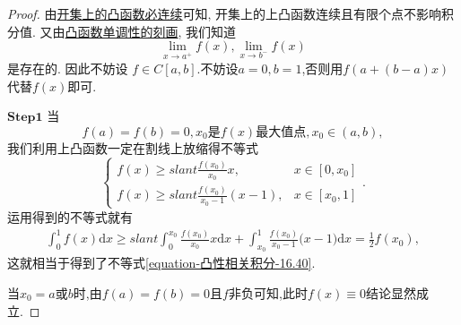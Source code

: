 \documentclass[../../main.tex]{subfiles}
\begin{document}
\begin{proof}
由\hyperref[corollary:开集上的下凸函数必连续]{开集上的凸函数必连续}可知, 开集上的上凸函数连续且有限个点不影响积分值. 又由\hyperref[proposition:下凸函数的单调性刻画]{凸函数单调性的刻画}, 我们知道
\[\lim_{x \to a^+}f(x), \lim_{x \to b^-}f(x)\]
是存在的. 因此不妨设 $f \in C[a,b]$.不妨设$a=0,b=1$,否则用$f(a+(b-a)x)$代替$f(x)$即可.

$\mathbf{Step}\mathbf{1}$ 当
\[f(a) = f(b) = 0, x_0\text{是}f(x)\text{最大值点}, x_0 \in (a,b),\]
我们利用上凸函数一定在割线上放缩得不等式
\[
\begin{cases}
f(x) \geqslant slant   \frac{f(x_0) }{x_0 }x, &x \in [0,x_0]\\
f(x) \geqslant slant \frac{f(x_0) }{x_0 - 1}(x - 1), &x \in [x_0,1]
\end{cases}.
\]
运用得到的不等式就有
\begin{align*}
\int_0^1{f(x)\mathrm{d}x\geqslant slant \int_0^{x_0}{\frac{f(x_0)}{x_0}x}}\mathrm{d}x+\int_{x_0}^1{\frac{f(x_0)}{x_0-1}(x}-1)\mathrm{d}x=\frac{1}{2}f(x_0),
\end{align*}
这就相当于得到了不等式\eqref{equation-凸性相关积分-16.40}.

当$x_0=a\text{或}b$时,由$f(a)=f(b)=0$且$f$非负可知,此时$f(x)\equiv 0$结论显然成立.


\end{proof}
\end{document}
